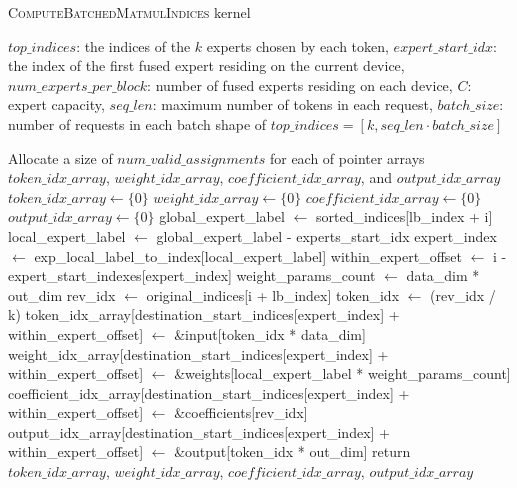 \begin{algorithm}[H]
  \caption{\textsc{ComputeBatchedMatmulIndices} kernel}
  \label{alg:compute-batched-matmul-indices}
  \small
  \begin{algorithmic}[1]
    \Ensure $top\_indices$: the indices of the $k$ experts chosen by each token, $expert\_start\_idx$: the index of the first fused expert residing on the current device, $num\_experts\_per\_block$: number of fused experts residing on each device, $C$: expert capacity, $seq\_len$: maximum number of tokens in each request, $batch\_size$: number of requests in each batch
    \Require shape of $top\_indices = [k, seq\_len \cdot batch\_size]$    

    \State Allocate a size of $num\_valid\_assignments$ for each of pointer arrays  $token\_idx\_array$, $weight\_idx\_array$, $coefficient\_idx\_array$, and $output\_idx\_array$
    \State $token\_idx\_array \leftarrow \{0\}$
    \State $weight\_idx\_array \leftarrow \{0\}$
    \State $coefficient\_idx\_array \leftarrow \{0\}$
    \State $output\_idx\_array \leftarrow \{0\}$
            \State global\_expert\_label $\leftarrow$ sorted\_indices[lb\_index + i]
            \State local\_expert\_label $\leftarrow$ global\_expert\_label - experts\_start\_idx
            \State expert\_index $\leftarrow$ exp\_local\_label\_to\_index[local\_expert\_label]
            \State within\_expert\_offset $\leftarrow$ i - expert\_start\_indexes[expert\_index]
            \State weight\_params\_count $\leftarrow$ data\_dim * out\_dim
                \State rev\_idx $\leftarrow$ original\_indices[i + lb\_index]
                \State token\_idx $\leftarrow$ (rev\_idx / k)
                \State token\_idx\_array[destination\_start\_indices[expert\_index] + within\_expert\_offset] $\leftarrow$ \&input[token\_idx * data\_dim]
                \State weight\_idx\_array[destination\_start\_indices[expert\_index] + within\_expert\_offset] $\leftarrow$ \&weights[local\_expert\_label * weight\_params\_count]
                \State coefficient\_idx\_array[destination\_start\_indices[expert\_index] + within\_expert\_offset] $\leftarrow$ \&coefficients[rev\_idx]
                \State output\_idx\_array[destination\_start\_indices[expert\_index] + within\_expert\_offset] $\leftarrow$ \&output[token\_idx * out\_dim]
            \EndIf
        \EndParallelFor
    \State return $token\_idx\_array$, $weight\_idx\_array$, $coefficient\_idx\_array$, $output\_idx\_array$
    \EndProcedure
  \end{algorithmic}
\end{algorithm}




